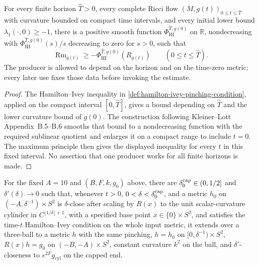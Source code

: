 \begin{lemma}
\label{lem:hamilton-ivey-phi-envelope}
\notready
For every finite horizon $\widehat T>0$, every complete Ricci flow
$(M,g(t))_{0\le t\le\widehat T}$ with curvature bounded on compact time
intervals, and every initial lower bound
$\lambda_1(\cdot,0)\ge-1$, there is a positive smooth function
$\Phi_{\mathrm{HI}}^{\widehat T,g(0)}$ on $\mathbb R$, nondecreasing with
$\Phi_{\mathrm{HI}}^{\widehat T,g(0)}(s)/s$ decreasing to zero for $s>0$,
such that
\[
 \operatorname{Rm}_{g(t)}\ge
 -\Phi_{\mathrm{HI}}^{\widehat T,g(0)}(R_{g(t)})
 \qquad(0\le t\le\widehat T).
\]
The producer is allowed to depend on the horizon and on the time-zero metric;
every later use fixes those data before invoking the estimate.
\end{lemma}

\begin{proof}
The Hamilton--Ivey inequality in
\ref{def:hamilton-ivey-pinching-condition}, applied on the compact interval
$[0,\widehat T]$, gives a bound depending on $\widehat T$ and the lower
curvature bound of $g(0)$.  The construction following Kleiner--Lott
Appendix~B.5--B.6 smooths that bound to a nondecreasing function with the
required sublinear quotient and enlarges it on a compact range to include
$t=0$.  The maximum principle then gives the displayed inequality for every
$t$ in this fixed interval.  No assertion that one producer works for all
finite horizons is made.
\end{proof}

\begin{lemma}
\label{lem:ricci-flow-surgery-cap-insertion}
\notready
For the fixed $A=10$ and $(B,F,k,g_0)$ above, there are
$\delta_0^{\rm cap}\in(0,1/2]$ and $\delta'(\delta)\to0$ such that, whenever
$t>0$, $0<\delta<\delta_0^{\rm cap}$, and a metric $h_0$ on
$(-A,\delta^{-1})\times S^2$ is $\delta$-close after scaling by $R(x)$ to the
unit scalar-curvature cylinder in $C^{\lfloor1/\delta\rfloor+1}$, with a
specified base point $x\in\{0\}\times S^2$, and satisfies the time-$t$
Hamilton--Ivey condition on the whole input metric, it extends over a
three-ball to a metric $h$ with the same pinching,
$h=h_0$ on $[0,\delta^{-1})\times S^2$, $R(x)h=g_0$ on
$(-B,-A)\times S^2$, constant curvature $k^2$ on the ball, and
$\delta'$-closeness to $e^{2F}g_{\mathrm{cyl}}$ on the capped end.
\end{lemma}

